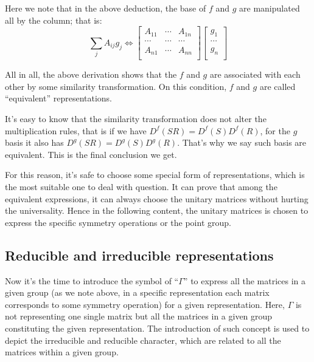 Here we note that in the above deduction, the base of $f$ and $g$ are
manipulated all by the column; that is:
\begin{equation}\label{}
  \sum_{j}A_{ij}g_{j} \Leftrightarrow
  \begin{bmatrix}
    A_{11} & \cdots & A_{1n} \\
    \cdots & \cdots & \cdots \\
    A_{n1} & \cdots & A_{nn} \\
  \end{bmatrix}
  \begin{bmatrix}
    g_{1}  \\
    \cdots \\
    g_{n}  \\
  \end{bmatrix}
\end{equation}

All in all, the above derivation shows that the $f$ and $g$ are
associated with each other by some similarity transformation. On this
condition, $f$ and $g$ are called ``equivalent'' representations.

It's easy to know that the similarity transformation does not alter
the multiplication rules, that is if we have $D^{f}(SR) =
D^{f}(S)D^{f}(R)$, for the $g$ basis it also has $D^{g}(SR) =
D^{g}(S)D^{g}(R)$. That's why we say such basis are equivalent. This
is the final conclusion we get.

For this reason, it's safe to choose some special form of
representations, which is the most suitable one to deal with
question. It can prove that among the equivalent expressions, it can
always choose the unitary matrices without hurting the universality.
Hence in the following content, the unitary matrices is chosen to
express the specific symmetry operations or the point group.

\subsection{Reducible and irreducible representations}
%
%
Now it's the time to introduce the symbol of ``$\Gamma$'' to express
all the matrices in a given group (as we note above, in a specific
representation each matrix corresponds to some symmetry operation) for
a given representation. Here, $\Gamma$ is not representing one single
matrix but all the matrices in a given group constituting the given
representation. The introduction of such concept is used to depict the
irreducible and reducible character, which are related to all the
matrices within a given group.


